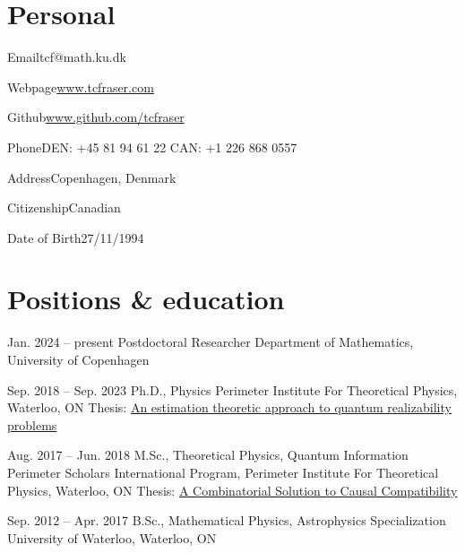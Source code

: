 \documentclass[10pt]{article}
\begin{document}
    \vspace{1em}
    \section{Personal}
    \begin{personallist}
        \item{Email}{tcf@math.ku.dk}
        \item{Webpage}{\href{https://www.tcfraser.com}{www.tcfraser.com}}
        \item{Github}{\href{https://www.github.com/tcfraser}{www.github.com/tcfraser}}
        \item{Phone}{DEN: +45 81 94 61 22 \hspace{2em} CAN: +1 226 868 0557}
        \item{Address}{Copenhagen, Denmark}
        \item{Citizenship}{Canadian}
        \item{Date of Birth}{27/11/1994}
    \end{personallist}
    \section{Positions \& education}
    \begin{educationlist}
        \item{Jan. 2024 -- present}
            {Postdoctoral Researcher}
            {Department of Mathematics, University of Copenhagen}
            {}
        \item{Sep. 2018 -- Sep. 2023}
            {Ph.D., Physics}
            {Perimeter Institute For Theoretical Physics, Waterloo, ON}
            {Thesis: \href{https://uwspace.uwaterloo.ca/items/91e64237-521a-4386-bb9e-caaf2cbc3eaa}{An estimation theoretic approach to quantum realizability problems}}
        \item{Aug. 2017 -- Jun. 2018}
            {M.Sc., Theoretical Physics, Quantum Information}
            {Perimeter Scholars International Program, Perimeter Institute For Theoretical Physics, Waterloo, ON}
            {Thesis: \href{https://www.degruyter.com/document/doi/10.1515/jci-2019-0013/html?lang=en}{A Combinatorial Solution to Causal Compatibility}}
        \item{Sep. 2012 -- Apr. 2017}
            {B.Sc., Mathematical Physics, Astrophysics Specialization}
            {University of Waterloo, Waterloo, ON}
            {}
    \end{educationlist}
\end{document}
